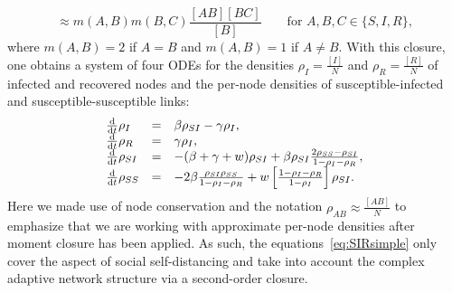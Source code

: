 \documentclass[12pt]{article}
\def\txtd{{\textnormal{d}}}
\newcommand{\benn}{\begin{equation*}}
\newcommand{\eenn}{\end{equation*}}
\begin{document}
\benn
[ABC]\approx m(A,B)m(B,C)\frac{[AB][BC]}{[B]}\qquad \text{for }A,B,C\in\{S,I,R\},
\eenn
where $m(A,B) =2$ if $A=B$ and $m(A,B) =1$ if $A\neq B$. With this closure, one obtains a system of four ODEs for the densities $\rho_I=\frac{[I]}{N}$ and $\rho_R=\frac{[R]}{N}$ of infected and recovered nodes and the per-node densities of susceptible-infected and susceptible-susceptible links:
 \begin{equation}
 \label{eq:SIRsimple}
 \begin{array}{lcl}
 \frac{\txtd }{\txtd t} \rho_I 
  &=&
   \beta \rho_{SI} - \gamma \rho_I,
   \\
   \frac{\txtd }{\txtd t} \rho_R 
  &=&
    \gamma \rho_I,
\\
   \frac{\txtd }{\txtd t} \rho_{SI}
&=&
-(\beta+\gamma+w) \rho_{SI} +\beta \rho_{SI}\frac{ 2 \rho_{SS}-\rho_{SI}  }{1-\rho_I-\rho_R},
\\
  \frac{\txtd }{\txtd t} \rho_{SS}
&=&
-2\beta \frac{\rho_{SI} \rho_{SS}}{1-\rho_I-\rho_R}
+w\left[\frac{1-\rho_I-\rho_R}{1-\rho_{I}}\right]\rho_{SI}.
\end{array}
 \end{equation}
Here we made use of node conservation
and the notation $\rho_{AB}\approx \frac{[AB]}{N}$ to emphasize that we are working with approximate per-node densities after moment closure has been applied. As such, the equations~\eqref{eq:SIRsimple} only cover the aspect of social self-distancing and take into account the complex adaptive network structure via a second-order closure.
\end{document}
